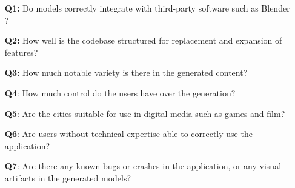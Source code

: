 \vspace{-0.5cm} %
\begin{itemize}
  \item[\textbf{Q1:}] Do models correctly integrate with third-party software such as Blender \cite{blender}?
  \item[\textbf{Q2:}] How well is the codebase structured for replacement and expansion of features?
  \item[\textbf{Q3:}] How much notable variety is there in the generated content?
  \item[\textbf{Q4}:] How much control do the users have over the generation?
  \item[\textbf{Q5}:] Are the cities suitable for use in digital media such as games and film?
  \item[\textbf{Q6}:] Are users without technical expertise able to correctly use the application?
  \item[\textbf{Q7}:] Are there any known bugs or crashes in the application, or any visual artifacts in the generated models?
\end{itemize}
